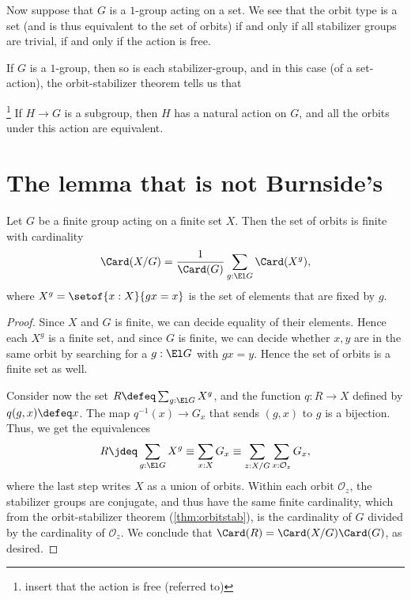 Now suppose that $G$ is a $1$-group acting on a set.
We see that the orbit type is a set
(and is thus equivalent to the set of orbits)
if and only if
all stabilizer groups are trivial,
\ie if and only if the action is free.

If $G$ is a $1$-group,
then so is each stabilizer-group,
and in this case (of a set-action),
the orbit-stabilizer theorem
tells us that

\begin{theorem}\footnote{insert that the action is free (referred to)}
\label{thm:lagrange}
  If $H \to G$ is a subgroup, then $H$ has a natural action on $G$,
  and all the orbits under this action are equivalent.
\end{theorem}


\section{The lemma that is not Burnside's}
\label{sec:burnsides-lemma}
\label{lem:burnsides-lemma}

\begin{lemma}
  \label{lem:burnside}
  Let $G$ be a finite group acting on a finite set $X$.
  Then the set of orbits is finite with cardinality
  \[
    \Card(X/G) = \frac1{\Card(G)}\sum_{g:\El G}\Card(X^g),
  \]
  where $X^g = \setof{x:X}{gx=x}$ is the set of elements
  that are fixed by $g$.
\end{lemma}
\begin{proof}
  Since $X$ and $G$ is finite, we can decide equality of their elements.
  Hence each $X^g$ is a finite set, and since $G$ is finite,
  we can decide whether $x,y$ are in the same orbit by searching
  for a $g : \El G$ with $gx = y$.
  Hence the set of orbits is a finite set as well.

  Consider now the set $R \defeq \sum_{g:\El G} X^g$,
  and the function $q : R \to X$
  defined by $q(g,x) \defeq x$.
  The map $q^{-1}(x) \to G_x$ that sends $(g,x)$ to $g$ is a bijection.
  Thus, we get the equivalences
  \[
    R \jdeq \sum_{g:\El G} X^g \equiv \sum_{x:X} G_x
    \equiv \sum_{z:X/G} \sum_{x : \mathcal O_z} G_x,
  \]
  where the last step writes $X$ as a union of orbits.
  Within each orbit $\mathcal O_z$,
  the stabilizer groups are conjugate,
  and thus have the same finite cardinality,
  which from the orbit-stabilizer theorem (\cref{thm:orbitstab}),
  is the cardinality of $G$ divided by the cardinality of $\mathcal O_z$.
  We conclude that $\Card(R) = \Card(X/G)\Card(G)$, as desired.
\end{proof}

